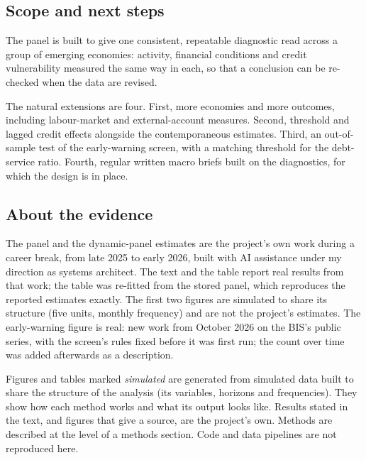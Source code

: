 \documentclass[
  british,
  a4paper,
]{article}
\begin{document}
\subsection{Scope and next steps}\label{scope-and-next-steps}

The panel is built to give one consistent, repeatable diagnostic read
across a group of emerging economies: activity, financial conditions and
credit vulnerability measured the same way in each, so that a conclusion
can be re-checked when the data are revised.

The natural extensions are four. First, more economies and more
outcomes, including labour-market and external-account measures. Second,
threshold and lagged credit effects alongside the contemporaneous
estimates. Third, an out-of-sample test of the early-warning screen,
with a matching threshold for the debt-service ratio. Fourth, regular
written macro briefs built on the diagnostics, for which the design is
in place.

\subsection{About the evidence}\label{about-the-evidence}

The panel and the dynamic-panel estimates are the project's own work
during a career break, from late 2025 to early 2026, built with AI
assistance under my direction as systems architect. The text and the
table report real results from that work; the table was re-fitted from
the stored panel, which reproduces the reported estimates exactly. The
first two figures are simulated to share its structure (five units,
monthly frequency) and are not the project's estimates. The
early-warning figure is real: new work from October 2026 on the BIS's
public series, with the screen's rules fixed before it was first run;
the count over time was added afterwards as a description.

Figures and tables marked \emph{simulated} are generated from simulated
data built to share the structure of the analysis (its variables,
horizons and frequencies). They show how each method works and what its
output looks like. Results stated in the text, and figures that give a
source, are the project's own. Methods are described at the level of a
methods section. Code and data pipelines are not reproduced here.
\end{document}
